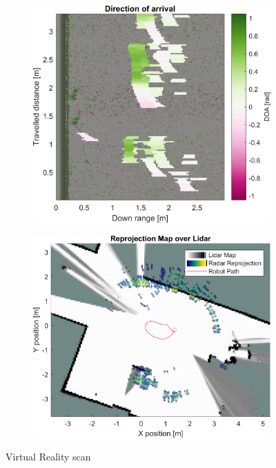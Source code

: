 \begin{figure}[htbp]
\begin{subfigure}[t]{0.475\linewidth}
    \end{subfigure}\bigskip\\
    \begin{subfigure}[t]{0.475\linewidth}
        \centering
        \includegraphics[width=\linewidth,max height=.475\textheight]{gfx/results/virtualreality_doa.png}
    \end{subfigure}%
    \hfill%
    \begin{subfigure}[t]{0.475\linewidth}
        \centering
        \includegraphics[width=\linewidth,max height=.475\textheight]{gfx/results/virtualreality_map.png}
    \end{subfigure}%
    \caption{Virtual Reality scan}
\end{figure}

